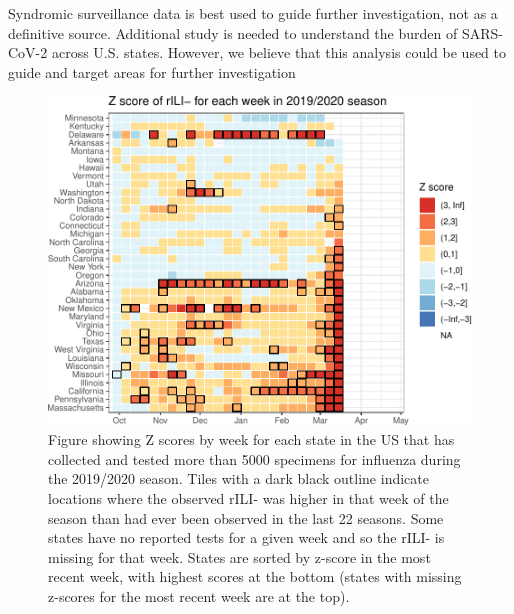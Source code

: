 \documentclass[]{article}
\begin{document}
Syndromic surveillance data is best used to guide further investigation,
not as a definitive source. Additional study is needed to understand the
burden of SARS-CoV-2 across U.S. states. However, we believe that this
analysis could be used to guide and target areas for further
investigation

\begin{figure}
\centering
\includegraphics{ili-labtest-report_files/figure-latex/calc-avg-sd-all-states-1.pdf}
\caption{Figure showing Z scores by week for each state in the US that
has collected and tested more than 5000 specimens for influenza during
the 2019/2020 season. Tiles with a dark black outline indicate locations
where the observed rILI- was higher in that week of the season than had
ever been observed in the last 22 seasons. Some states have no reported
tests for a given week and so the rILI- is missing for that week. States
are sorted by z-score in the most recent week, with highest scores at
the bottom (states with missing z-scores for the most recent week are at
the top).}
\end{figure}
\end{document}
